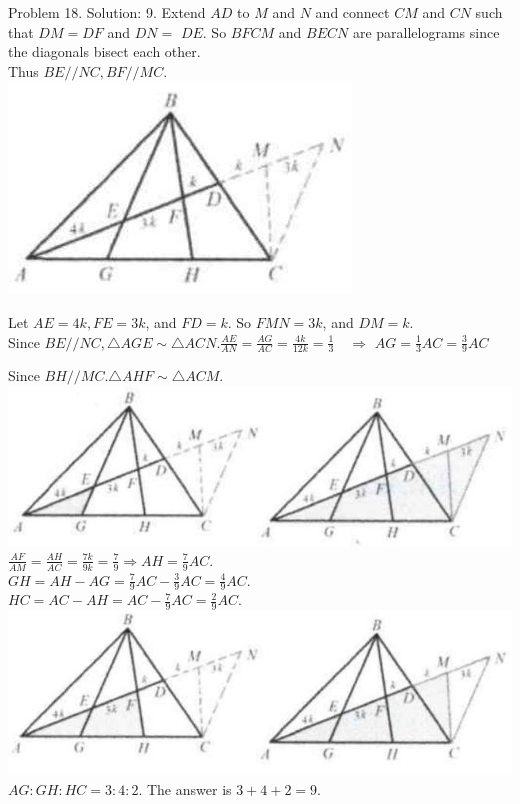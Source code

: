 \documentclass[10pt]{article}
\begin{document}
Problem 18. Solution: 9.
Extend \(A D\) to \(M\) and \(N\) and connect \(C M\) and \(C N\) such that \(D M=D F\) and \(D N=\) \(D E\). So \(B F C M\) and \(B E C N\) are parallelograms since the diagonals bisect each other.\\
Thus \(B E / / N C, B F / / M C\).\\
\includegraphics[max width=\textwidth, center]{2025_04_17_97bc1f7e44d93c271a88g-140(1)}

Let \(A E=4 k, F E=3 k\), and \(F D=k\). So \(F M N=3 k\), and \(D M=k\).\\
Since \(B E / / N C, \triangle A G E \sim \triangle A C N . \frac{A E}{A N}=\frac{A G}{A C}=\frac{4 k}{12 k}=\frac{1}{3} \quad \Rightarrow\) \(A G=\frac{1}{3} A C=\frac{3}{9} A C\)

Since \(B H / / M C . \triangle A H F \sim \triangle A C M\).\\
\includegraphics[max width=\textwidth, center]{2025_04_17_97bc1f7e44d93c271a88g-140(3)}\\
\(\frac{A F}{A M}=\frac{A H}{A C}=\frac{7 k}{9 k}=\frac{7}{9} \Rightarrow A H=\frac{7}{9} A C\).\\
\(G H=A H-A G=\frac{7}{9} A C-\frac{3}{9} A C=\frac{4}{9} A C\).\\
\(H C=A C-A H=A C-\frac{7}{9} A C=\frac{2}{9} A C\).\\
\includegraphics[max width=\textwidth, center]{2025_04_17_97bc1f7e44d93c271a88g-140}\\
\(A G: G H: H C=3: 4: 2\). The answer is \(3+4+2=9\).
\end{document}
